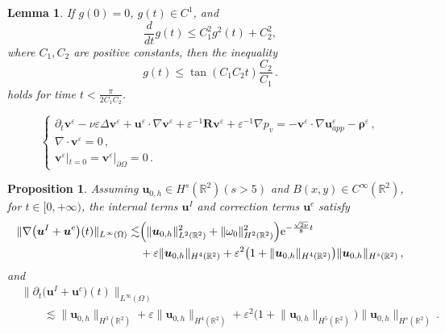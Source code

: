 \documentclass[10pt,a4paper]{amsart}
\newtheorem{lemma}{Lemma}
\newtheorem{proposition}{Proposition}
\begin{document}
\begin{lemma}\label{f4}
	If \( g(0) = 0 \), \( g(t) \in C^1 \), and   
	\begin{equation}\label{1.28}
		\frac{d}{dt}g(t) \leq C_1^2 g^2(t) + C_2^2,
	\end{equation}
	where \( C_1, C_2 \) are positive constants, then the inequality 
	\begin{equation}\label{1.29}
		g(t) \leq \tan(C_1 C_2 t) \frac{C_2}{C_1}\,.
	\end{equation}
	holds for time  $t< \frac{\pi}{2C_1 C_2}$.
\end{lemma}

\begin{equation}\label{2.65}
	\begin{cases}
		\partial_{t} {\boldsymbol v}^{\varepsilon}-\nu\varepsilon\Delta{\boldsymbol v}^{\varepsilon}
		+{\boldsymbol u}^{\varepsilon} \cdot \nabla {\boldsymbol v}^{\varepsilon}
		+{\varepsilon}^{-1}\boldsymbol{R}\boldsymbol v^{\varepsilon}
		+{\varepsilon}^{-1}\nabla p_v 
		=-{\boldsymbol v}^{\varepsilon} \cdot \nabla\boldsymbol{u}^\varepsilon_{app}
		-\boldsymbol \rho^{\varepsilon}\,,\\
		\nabla\cdot {\boldsymbol v}^{\varepsilon}=0\,,\\
		{\boldsymbol v}^{\varepsilon}|_{t=0}={\boldsymbol v}^{\varepsilon}|_{\partial\Omega}=0\,.
	\end{cases}
\end{equation}

\begin{proposition}\label{propIC}
	Assuming ${\boldsymbol{u}}_{0,h}\in H^s(\mathbb{R}^2)(s>5)$ and $B(x,y)\in C^\infty(\mathbb{R}^2)$, 
	for $t\in [0,+\infty)$,
	the internal terms $\boldsymbol{u}^I$ and correction terms $\boldsymbol{u}^c$ satisfy 
	\begin{align*} 
		\lVert \nabla\big(
		\boldsymbol{u}^{I} 
		+\boldsymbol{u}^{c}
		\big)(t)
		\rVert_{L^{\infty}(\Omega)}
		\lesssim
		&\Big(\lVert{\boldsymbol{u}}_{0,h}\rVert_{L^2(\mathbb{R}^2)}^2+\lVert{\omega}_0\rVert_{H^2(\mathbb{R}^2)}^2\Big) \mathrm{e}^{-\frac{\sqrt{2\nu}}{8}  t}
		\notag\\
		&+\varepsilon
		\lVert {\boldsymbol{u}}_{0,h} \rVert_{H^{4}(\mathbb{R}^2)}
		+\varepsilon^2
		\big(
		1+
		\lVert {\boldsymbol{u}}_{0,h} \rVert_{H^{4}(\mathbb{R}^2)}
		\big)
		\lVert {\boldsymbol{u}}_{0,h} \rVert_{H^{s}(\mathbb{R}^2)}\,,
	\end{align*}
	and
	\begin{align*} 
		&\lVert \partial_t
		\big(
		\boldsymbol{u}^{I} 
		+\boldsymbol{u}^{c}\big)(t) \rVert_{L^{\infty}(\Omega)}\\
		&\qquad\lesssim
		\lVert{\boldsymbol{u}}_{0,h}\rVert_{H^{3}(\mathbb{R}^2)}
		+\varepsilon
		\lVert{\boldsymbol{u}}_{0,h}\rVert_{H^{4}(\mathbb{R}^2)}
		+\varepsilon^2
		\big(
		1+
		\lVert {\boldsymbol{u}}_{0,h} \rVert_{H^{5}(\mathbb{R}^2)}
		\big)
		\lVert {\boldsymbol{u}}_{0,h} \rVert_{H^{s}(\mathbb{R}^2)}\,.
	\end{align*}
\end{proposition}
\end{document}
